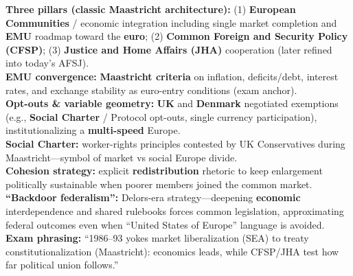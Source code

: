 \documentclass[10pt,a4paper]{article}
\begin{document}
{\textbf{Three pillars (classic Maastricht architecture):} (1) \textbf{European Communities} / economic integration including single market completion and \textbf{EMU} roadmap toward the \textbf{euro}; (2) \textbf{Common Foreign and Security Policy (CFSP)}; (3) \textbf{Justice and Home Affairs (JHA)} cooperation (later refined into today's AFSJ).\\
\textbf{EMU convergence:} \textbf{Maastricht criteria} on inflation, deficits/debt, interest rates, and exchange stability as euro-entry conditions (exam anchor).\\
\textbf{Opt-outs \& variable geometry:} \textbf{UK} and \textbf{Denmark} negotiated exemptions (e.g., \textbf{Social Charter} / Protocol opt-outs, single currency participation), institutionalizing a \textbf{multi-speed} Europe.\\
\textbf{Social Charter:} worker-rights principles contested by UK Conservatives during Maastricht---symbol of market vs social Europe divide.\\
\textbf{Cohesion strategy:} explicit \textbf{redistribution} rhetoric to keep enlargement politically sustainable when poorer members joined the common market.\\
\textbf{``Backdoor federalism'':} Delors-era strategy---deepening \textbf{economic} interdependence and shared rulebooks forces common legislation, approximating federal outcomes even when ``United States of Europe'' language is avoided.\\
\textbf{Exam phrasing:} ``1986--93 yokes market liberalization (SEA) to treaty constitutionalization (Maastricht): economics leads, while CFSP/JHA test how far political union follows.''
}
\end{document}
